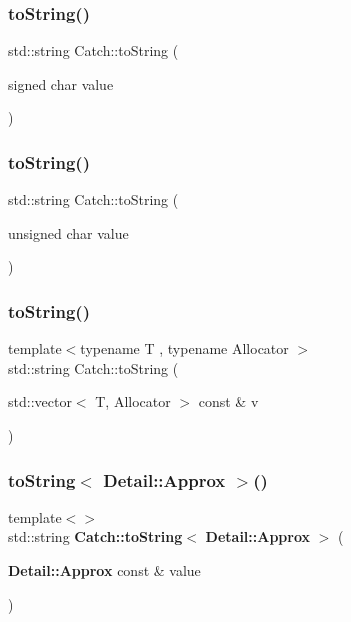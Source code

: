 \mbox{\label{namespace_catch_a0a5d9d0965d0d2a0663773732283713e}} 
\subsubsection{to\+String()\hspace{0.1cm}{\footnotesize\ttfamily [15/17]}}
{\footnotesize\ttfamily std\+::string Catch\+::to\+String (\begin{DoxyParamCaption}\item[{signed char}]{value }\end{DoxyParamCaption})}

\mbox{\label{namespace_catch_a5d83eaeb68579a556c86cc05f7a7765f}} 
\subsubsection{to\+String()\hspace{0.1cm}{\footnotesize\ttfamily [16/17]}}
{\footnotesize\ttfamily std\+::string Catch\+::to\+String (\begin{DoxyParamCaption}\item[{unsigned char}]{value }\end{DoxyParamCaption})}

\mbox{\label{namespace_catch_a2899237fef39daaae9a22e7846c0a9bf}} 
\subsubsection{to\+String()\hspace{0.1cm}{\footnotesize\ttfamily [17/17]}}
{\footnotesize\ttfamily template$<$typename T , typename Allocator $>$ \\
std\+::string Catch\+::to\+String (\begin{DoxyParamCaption}\item[{std\+::vector$<$ T, Allocator $>$ const \&}]{v }\end{DoxyParamCaption})}

\mbox{\label{namespace_catch_ac501c2b6bfe82978d699ddda37c53d13}} 
\subsubsection{to\+String$<$ Detail\+::\+Approx $>$()}
{\footnotesize\ttfamily template$<$$>$ \\
std\+::string \textbf{ Catch\+::to\+String}$<$ \textbf{ Detail\+::\+Approx} $>$ (\begin{DoxyParamCaption}\item[{\textbf{ Detail\+::\+Approx} const \&}]{value }\end{DoxyParamCaption})\hspace{0.3cm}{\ttfamily [inline]}}

